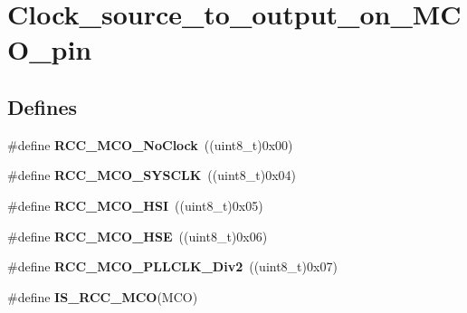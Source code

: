 \hypertarget{group__Clock__source__to__output__on__MCO__pin}{
\section{Clock\_\-source\_\-to\_\-output\_\-on\_\-MCO\_\-pin}
\label{group__Clock__source__to__output__on__MCO__pin}
}
\subsection*{Defines}
\begin{DoxyCompactItemize}
\item 
\hypertarget{group__Clock__source__to__output__on__MCO__pin_ga1f39ff9f5606d3ad56e221d253be17d3}{
\#define {\bfseries RCC\_\-MCO\_\-NoClock}~((uint8\_\-t)0x00)}
\label{group__Clock__source__to__output__on__MCO__pin_ga1f39ff9f5606d3ad56e221d253be17d3}

\item 
\hypertarget{group__Clock__source__to__output__on__MCO__pin_gab766ad89492ffe915de3438aaa96891b}{
\#define {\bfseries RCC\_\-MCO\_\-SYSCLK}~((uint8\_\-t)0x04)}
\label{group__Clock__source__to__output__on__MCO__pin_gab766ad89492ffe915de3438aaa96891b}

\item 
\hypertarget{group__Clock__source__to__output__on__MCO__pin_ga7206cdf03826781dc4fb1b094475d744}{
\#define {\bfseries RCC\_\-MCO\_\-HSI}~((uint8\_\-t)0x05)}
\label{group__Clock__source__to__output__on__MCO__pin_ga7206cdf03826781dc4fb1b094475d744}

\item 
\hypertarget{group__Clock__source__to__output__on__MCO__pin_ga8bd64bbefd2a725a0cfe2f2902dd9b0f}{
\#define {\bfseries RCC\_\-MCO\_\-HSE}~((uint8\_\-t)0x06)}
\label{group__Clock__source__to__output__on__MCO__pin_ga8bd64bbefd2a725a0cfe2f2902dd9b0f}

\item 
\hypertarget{group__Clock__source__to__output__on__MCO__pin_ga1ce4233675bd7bdcb0220ed10ee7d8be}{
\#define {\bfseries RCC\_\-MCO\_\-PLLCLK\_\-Div2}~((uint8\_\-t)0x07)}
\label{group__Clock__source__to__output__on__MCO__pin_ga1ce4233675bd7bdcb0220ed10ee7d8be}

\item 
\#define {\bfseries IS\_\-RCC\_\-MCO}(MCO)
\end{DoxyCompactItemize}


